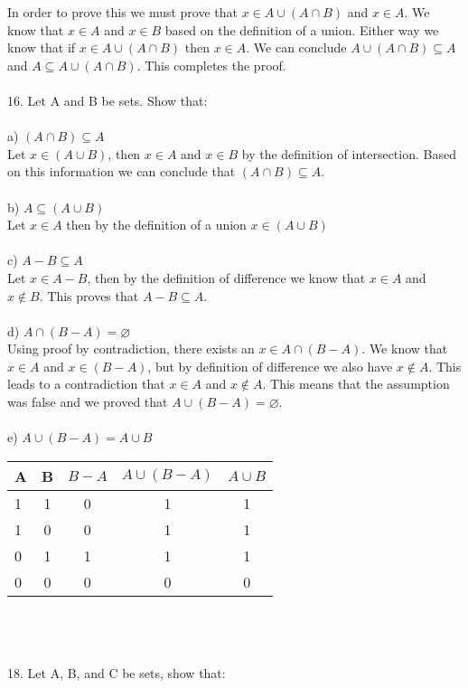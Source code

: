 \documentclass[11pt, oneside]{article}   	%
\begin{document}
In order to prove this we must prove that $x\in A\cup(A\cap B)$ and $x\in A$.  We know that $x\in A$ and $x\in B$ based on the definition of a union. Either way we know that if $x\in A\cup(A\cap B)$ then $x\in A$. We can conclude $A\cup(A\cap B)\subseteq A$ and $A\subseteq A\cup(A\cap B)$. This completes the proof.\\\\
16. Let A and B be sets. Show that:\\\\
a) $(A\cap B)\subseteq A$\\
Let $x\in(A\cup B)$, then $x\in A$ and $x\in B$ by the definition of intersection. Based on this information we can conclude that $(A\cap B)\subseteq A$.\\\\
b) $A\subseteq (A\cup B)$\\
Let $x\in A$ then by the definition of a union $x\in(A\cup B)$\\\\
c) $A - B\subseteq A$\\
Let $x\in A - B$, then by the definition of difference we know that $x\in A$ and $x\notin B$. This proves that $A - B\subseteq A$.\\\\
d) $A\cap(B - A) = \varnothing$\\
Using proof by contradiction, there exists an $x\in A\cap(B - A)$. We know that $x\in A$ and $x\in(B - A)$, but by definition of difference we also have $x\notin A$. This leads to a contradiction that $x\in A$ and $x\notin A$. This means that the assumption was false and we proved that $A\cup (B - A) = \varnothing$.\\\\ 
e) $A\cup(B - A) = A\cup B$\\
 \begin{tabular} {| l | c | c | c | c | }
  \hline
  A & B & $B - A$ & $A\cup(B - A)$ & $A\cup B$ \\ \hline
  1 & 1 & 0 & 1 & 1 \\ \hline
  1 & 0 & 0 & 1 & 1 \\ \hline
  0 & 1 & 1 & 1 & 1  \\ \hline
  0 & 0 & 0 & 0 & 0  \\ \hline
\end{tabular}\\\\\\
18. Let A, B, and C be sets, show that: \\\\
\end{document}
